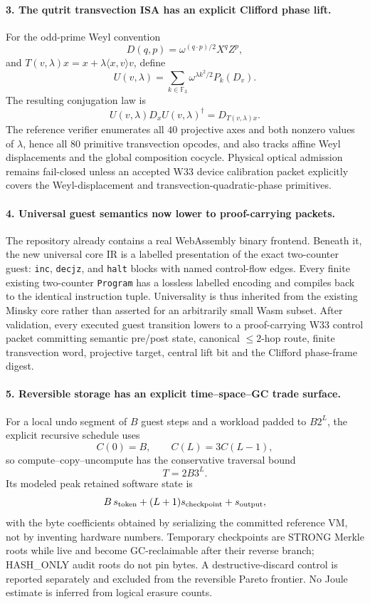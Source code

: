 \paragraph{3. The qutrit transvection ISA has an explicit Clifford phase lift.}
For the odd-prime Weyl convention
\[
 D(q,p)=\omega^{(q\cdot p)/2}X^qZ^p,
\]
and $T(v,\lambda)x=x+\lambda\langle x,v\rangle v$, define
\[
 U(v,\lambda)=\sum_{k\in\mathbb F_3}
 \omega^{\lambda k^2/2}P_k(D_v).
\]
The resulting conjugation law is
\[
 U(v,\lambda)D_xU(v,\lambda)^\dagger=D_{T(v,\lambda)x}.
\]
The reference verifier enumerates all $40$ projective axes and both nonzero values of
$\lambda$, hence all $80$ primitive transvection opcodes, and also tracks affine Weyl
displacements and the global composition cocycle.  Physical optical admission remains
fail-closed unless an accepted W33 device calibration packet explicitly covers the
Weyl-displacement and transvection-quadratic-phase primitives.

\paragraph{4. Universal guest semantics now lower to proof-carrying packets.}
The repository already contains a real WebAssembly binary frontend.  Beneath it, the
new universal core IR is a labelled presentation of the exact two-counter guest:
\texttt{inc}, \texttt{decjz}, and \texttt{halt} blocks with named control-flow
edges. Every finite existing two-counter \texttt{Program} has a lossless labelled
encoding and compiles back to the identical instruction tuple.  Universality is thus
inherited from the existing Minsky core rather than asserted for an arbitrarily small
Wasm subset.  After validation, every executed guest transition lowers to a
proof-carrying W33 control packet committing semantic pre/post state, canonical
$\le2$-hop route, finite transvection word, projective target, central lift bit and the
Clifford phase-frame digest.

\paragraph{5. Reversible storage has an explicit time--space--GC trade surface.}
For a local undo segment of $B$ guest steps and a workload padded to $B2^L$, the
explicit recursive schedule uses
\[
 C(0)=B,\qquad C(L)=3C(L-1),
\]
so compute--copy--uncompute has the conservative traversal bound
\[
 T=2B3^L.
\]
Its modeled peak retained software state is
\[
 B\,s_{\rm token}+(L+1)s_{\rm checkpoint}+s_{\rm output},
\]
with the byte coefficients obtained by serializing the committed reference VM, not by
inventing hardware numbers.  Temporary checkpoints are STRONG Merkle roots while live
and become GC-reclaimable after their reverse branch; HASH\_ONLY audit roots do not pin
bytes.  A destructive-discard control is reported separately and excluded from the
reversible Pareto frontier. No Joule estimate is inferred from logical erasure counts.


